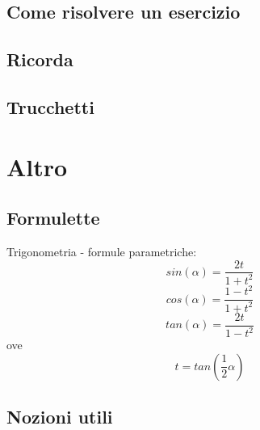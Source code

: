 \documentclass[a4paper,10pt]{book}
\begin{document}
\subsection{Come risolvere un esercizio}

\subsection{Ricorda}
\subsection{Trucchetti}

\section{Altro}
\subsection{Formulette}
Trigonometria - formule parametriche:
$$sin(\alpha) = \frac{2t}{1+t^2}$$
$$cos(\alpha) = \frac{1-t^2}{1+t^2}$$
$$tan(\alpha) = \frac{2t}{1-t^2}$$
ove $$t = tan(\frac{1}{2}\alpha)$$
\subsection{Nozioni utili}
\end{document}
